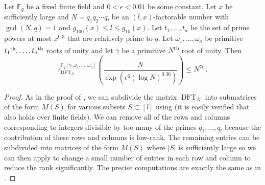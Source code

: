 \documentclass{toc}
\newcommand\F{{\mathbb{F}}}
\newcommand{\ts}{\textsuperscript}
\DeclareMathOperator{\DFT}{DFT}
\begin{document}
\begin{theorem}\label{factorable_finitefield}
Let $\F_q$ be a fixed finite field and $0 <\epsilon < 0.01$ be some constant.  Let $x$ be sufficiently large and
%
$N = q_1q_2\cdots q_l$ be an
$(l, x)$-factorable number with $\gcd(N,q) = 1$ and $g_{100}(x) \leq l \leq g_{10}(x)$. Let $t_1, \dots , t_a$ be the set of prime powers at most $x^{0.3}$ that are relatively prime to $q$.  Let $\omega_1, \dots , \omega_a$ be primitive
%
$t_1\ts{th}, \dots , t_a\ts{th}$ 
roots of unity and let $\gamma$ be a primitive $N$\ts{th} root of unity.  Then 
%
%
%
%
\[
\textsf{r}^{\F_q[\gamma, \omega_1, \dots , \omega_n]}_{\DFT_N}\left( \frac{N}{\exp\left(\epsilon^6 (\log N)^{0.36}\right)} \right) \leq N^{ 7 \epsilon} \,.
\]
%
\end{theorem}
\begin{proof}
As in the proof of , we can subdivide the matrix $\DFT_N$ into submatrices of the form $M(S)$ for various subsets $S \subset [l]$ using  (it is easily verified that  also holds over finite fields).  We can remove all of the rows and columns corresponding to integers divisible by too many of the primes $q_1, \dots , q_l$ because the contribution of these rows and columns is low-rank.  The remaining entries can be subdivided into matrices of the form $M(S)$ where $|S|$ is sufficiently large so we can then apply  to change a small number of entries in each row and column to reduce the rank significantly.  The precise computations are exactly the same as in .
\end{proof}
\end{document}
